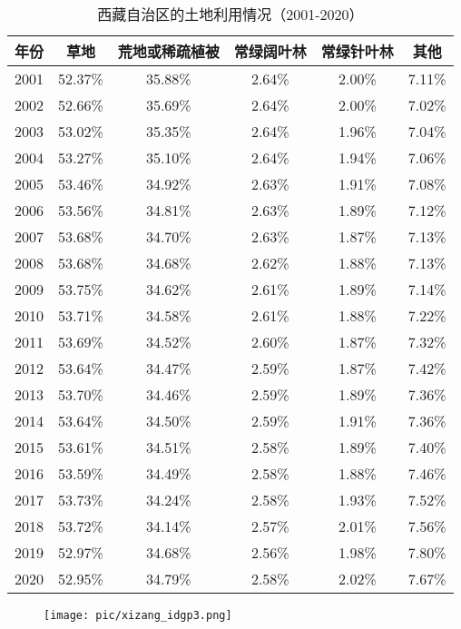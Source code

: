 \documentclass{article}
\begin{document}
		
		\begin{table}[H]
			\centering
			\begin{tabular}{|c|c|c|c|c|c|}
				\hline
				年份 & 草地 & 荒地或稀疏植被 & 常绿阔叶林 & 常绿针叶林 & 其他 \\
				\hline
				2001 & 52.37\% & 35.88\% & 2.64\% & 2.00\% & 7.11\% \\
				2002 & 52.66\% & 35.69\% & 2.64\% & 2.00\% & 7.02\% \\
				2003 & 53.02\% & 35.35\% & 2.64\% & 1.96\% & 7.04\% \\
				2004 & 53.27\% & 35.10\% & 2.64\% & 1.94\% & 7.06\% \\
				2005 & 53.46\% & 34.92\% & 2.63\% & 1.91\% & 7.08\% \\
				2006 & 53.56\% & 34.81\% & 2.63\% & 1.89\% & 7.12\% \\
				2007 & 53.68\% & 34.70\% & 2.63\% & 1.87\% & 7.13\% \\
				2008 & 53.68\% & 34.68\% & 2.62\% & 1.88\% & 7.13\% \\
				2009 & 53.75\% & 34.62\% & 2.61\% & 1.89\% & 7.14\% \\
				2010 & 53.71\% & 34.58\% & 2.61\% & 1.88\% & 7.22\% \\
				2011 & 53.69\% & 34.52\% & 2.60\% & 1.87\% & 7.32\% \\
				2012 & 53.64\% & 34.47\% & 2.59\% & 1.87\% & 7.42\% \\
				2013 & 53.70\% & 34.46\% & 2.59\% & 1.89\% & 7.36\% \\
				2014 & 53.64\% & 34.50\% & 2.59\% & 1.91\% & 7.36\% \\
				2015 & 53.61\% & 34.51\% & 2.58\% & 1.89\% & 7.40\% \\
				2016 & 53.59\% & 34.49\% & 2.58\% & 1.88\% & 7.46\% \\
				2017 & 53.73\% & 34.24\% & 2.58\% & 1.93\% & 7.52\% \\
				2018 & 53.72\% & 34.14\% & 2.57\% & 2.01\% & 7.56\% \\
				2019 & 52.97\% & 34.68\% & 2.56\% & 1.98\% & 7.80\% \\
				2020 & 52.95\% & 34.79\% & 2.58\% & 2.02\% & 7.67\% \\
				\hline
			\end{tabular}
			\caption{西藏自治区的土地利用情况（2001-2020）}
		\end{table}
		
		\begin{figure}[H]  %
			\centering
			\texttt{[image: pic/xizang\_idgp3.png]} %
		\end{figure}
		
\end{document}
